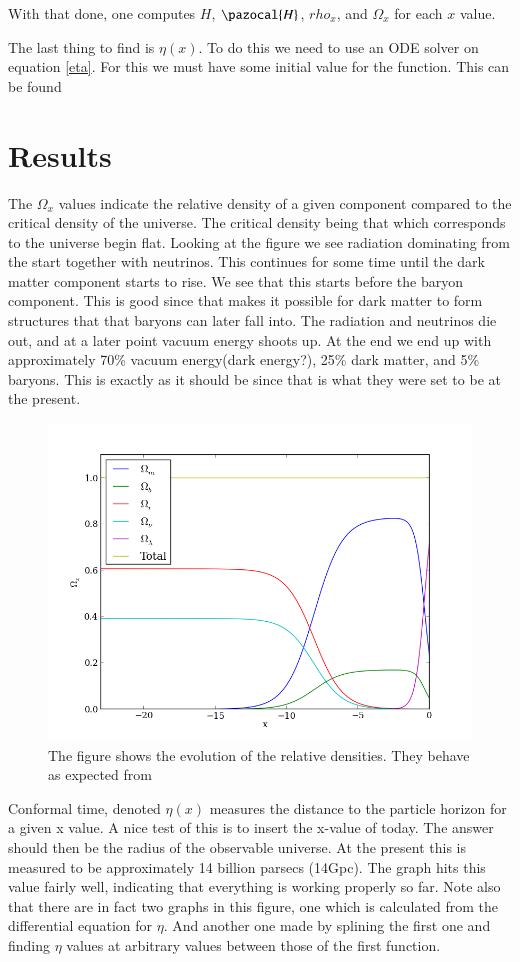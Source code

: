 \documentclass{aa}   %
\begin{document}
With that done, one computes $H$, $\pazocal{H}$, $rho_x$, and $\Omega_x$ for each $x$ value.

The last thing to find is $\eta(x)$. To do this we need to use an ODE solver on equation \ref{eta}. For this we must have some initial value for the function. This can be found 


\section{Results}\label{sec:simulate_analytic}
 The $\Omega_x$ values indicate the relative density of a given component compared to the critical density of the universe. 
 The critical density being that which corresponds to the universe begin flat.
 Looking at the figure we see radiation dominating from the start together with neutrinos.
 This continues for some time until the dark matter component starts to rise.
 We see that this starts before the baryon component. This is good since that makes it possible for dark matter to form structures that that baryons can later fall into. The radiation and neutrinos die out, and at a later point vacuum energy shoots up. At the end we end up with approximately 70\% vacuum energy(dark energy?), 25\% dark matter, and 5\% baryons. This is exactly as it should be since that is what they were set to be at the present.
 \begin{figure}[ht]
  \includegraphics[width=.49\textwidth]{figure_0.png}
  \caption{The figure shows the evolution of the relative densities. They behave as expected from}
 \label{figure0}
 \end{figure}
 
 Conformal time, denoted $\eta(x)$ measures the distance to the particle horizon for a given x value. A nice test of this is to insert the x-value of today.
 The answer should then be the radius of the observable universe. At the present this is measured to be approximately 14 billion parsecs (14Gpc). 
 The graph hits this value fairly well, indicating that everything is working properly so far. 
 Note also that there are in fact two graphs in this figure, one which is calculated from the differential equation for $\eta$. 
 And another one made by splining the first one and finding $\eta$ values at arbitrary values between those of the first function.
 
\end{document}
